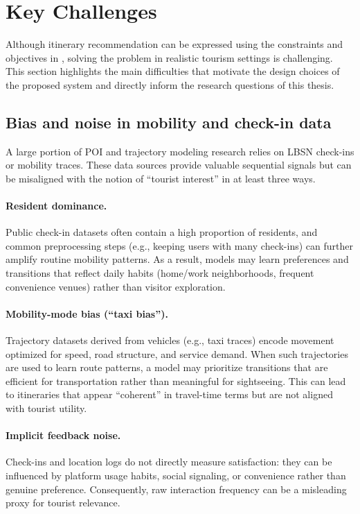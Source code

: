 \section{Key Challenges}
\label{sec:prob-challenges}

Although itinerary recommendation can be expressed using the constraints and objectives in , solving the problem in realistic tourism settings is challenging. This section highlights the main difficulties that motivate the design choices of the proposed system and directly inform the research questions of this thesis.

\subsection{Bias and noise in mobility and check-in data}
A large portion of POI and trajectory modeling research relies on LBSN check-ins or mobility traces. These data sources provide valuable sequential signals but can be misaligned with the notion of ``tourist interest'' in at least three ways.

\paragraph{Resident dominance.}
Public check-in datasets often contain a high proportion of residents, and common preprocessing steps (e.g., keeping users with many check-ins) can further amplify routine mobility patterns. As a result, models may learn preferences and transitions that reflect daily habits (home/work neighborhoods, frequent convenience venues) rather than visitor exploration.

\paragraph{Mobility-mode bias (``taxi bias'').}
Trajectory datasets derived from vehicles (e.g., taxi traces) encode movement optimized for speed, road structure, and service demand. When such trajectories are used to learn route patterns, a model may prioritize transitions that are efficient for transportation rather than meaningful for sightseeing. This can lead to itineraries that appear ``coherent'' in travel-time terms but are not aligned with tourist utility.

\paragraph{Implicit feedback noise.}
Check-ins and location logs do not directly measure satisfaction: they can be influenced by platform usage habits, social signaling, or convenience rather than genuine preference. Consequently, raw interaction frequency can be a misleading proxy for tourist relevance.

